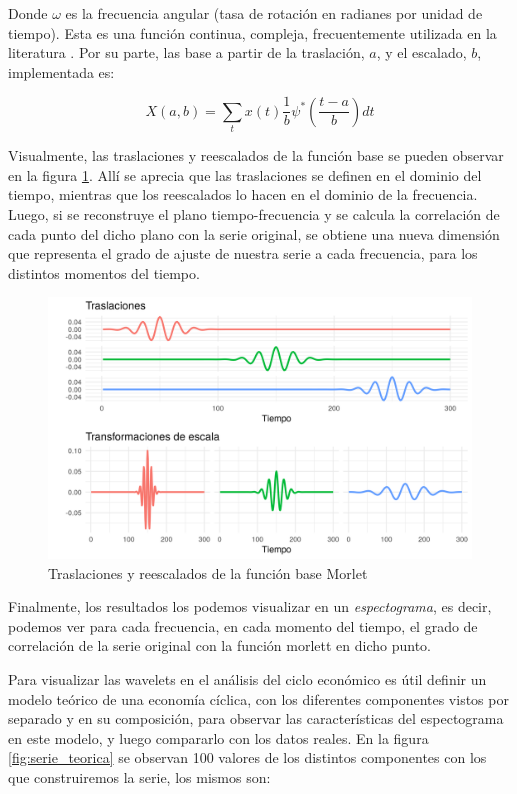 \documentclass[a4paper]{article}
\begin{document}
Donde $\omega$ es la frecuencia angular (tasa de rotación en radianes por unidad de tiempo). Esta es una función continua, compleja, frecuentemente utilizada en la literatura \citep{conraria2011continuous}. Por su parte, las base a partir de la traslación, $a$, y el escalado, $b$, implementada es:

$$
X(a,b)=\sum_{t} x(t)   \frac{1}{b} \psi^*\left(\frac{t-a}{b}\right)dt
$$

Visualmente, las traslaciones y reescalados de la función base se pueden observar en la figura \ref{fig:morlet}. Allí se aprecia que las traslaciones se definen en el dominio del tiempo, mientras que los reescalados lo hacen en el dominio de la frecuencia. Luego, si se reconstruye el plano tiempo-frecuencia y se calcula la correlación de cada punto del dicho plano con la serie original, se obtiene una nueva dimensión que representa el grado de ajuste de nuestra serie a cada frecuencia, para los distintos momentos del tiempo. 

\begin{figure}[H]
	\centering
	\includegraphics[width=\linewidth]{morelt.png}
	\caption{Traslaciones y reescalados de la función base Morlet} \label{fig:morlet}
\end{figure}


Finalmente, los resultados los podemos visualizar en un \textit{espectograma}, es decir, podemos ver para cada frecuencia, en cada momento del tiempo, el grado de correlación de la serie original con la función morlett en dicho punto.


Para visualizar las wavelets en el análisis del ciclo económico es útil definir un modelo teórico de una economía cíclica, con los diferentes componentes vistos por separado y en su composición, para observar las características del espectograma en este modelo,  y luego compararlo con los datos reales. 
En la figura \ref{fig:serie_teorica} se observan 100 valores de los distintos componentes con los que construiremos la serie, los mismos son:
\end{document}
